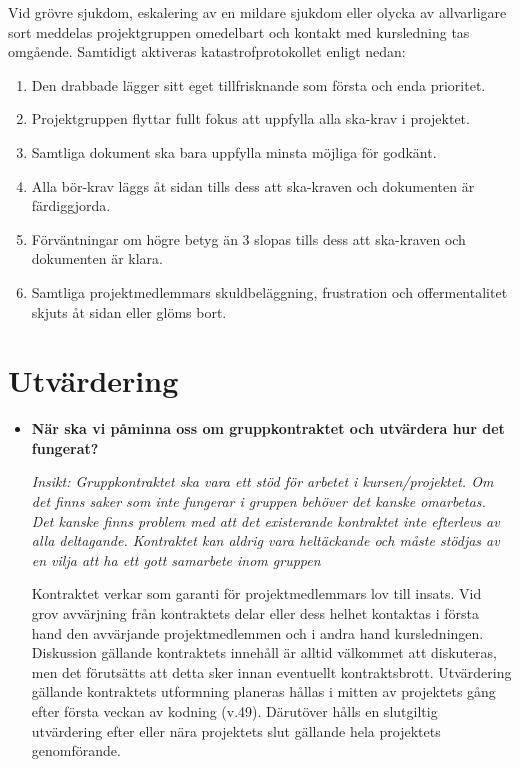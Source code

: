 \documentclass{mall}
\begin{document}
\begin{itemize}
  Vid grövre sjukdom, eskalering av en mildare sjukdom eller olycka av allvarligare sort meddelas projektgruppen omedelbart och kontakt med kursledning tas omgående. Samtidigt aktiveras katastrofprotokollet enligt nedan:
  \begin{enumerate}
  \item Den drabbade lägger sitt eget tillfrisknande som första och enda prioritet.
  \item Projektgruppen flyttar fullt fokus att uppfylla alla ska-krav i projektet.
  \item Samtliga dokument ska bara uppfylla minsta möjliga för godkänt.
  \item Alla bör-krav läggs åt sidan tills dess att ska-kraven och dokumenten är färdiggjorda.
  \item Förväntningar om högre betyg än 3 slopas tills dess att ska-kraven och dokumenten är klara.
  \item Samtliga projektmedlemmars skuldbeläggning, frustration och offermentalitet skjuts åt sidan eller glöms bort.
  \end{enumerate}
  

\end{itemize}

\section{Utvärdering}

\begin{itemize}
\item \textbf{När ska vi påminna oss om gruppkontraktet och utvärdera hur det fungerat?}

  \emph{Insikt: Gruppkontraktet ska vara ett stöd för arbetet i kursen/projektet. Om det finns saker som
    inte fungerar i gruppen behöver det kanske omarbetas. Det kanske finns problem med att det existerande
    kontraktet inte efterlevs av alla deltagande. Kontraktet kan aldrig vara heltäckande och måste stödjas
    av en vilja att ha ett gott samarbete inom gruppen}
  
  Kontraktet verkar som garanti för projektmedlemmars lov till insats. Vid grov avvärjning från kontraktets delar eller dess helhet kontaktas i första hand den avvärjande projektmedlemmen och i andra hand kursledningen. Diskussion gällande kontraktets innehåll är alltid välkommet att diskuteras, men det förutsätts att detta sker innan eventuellt kontraktsbrott. Utvärdering gällande kontraktets utformning planeras hållas i mitten av projektets gång efter första veckan av kodning (v.49). Därutöver hålls en slutgiltig utvärdering efter eller nära projektets slut gällande hela projektets genomförande.


\end{itemize}
\end{document}
